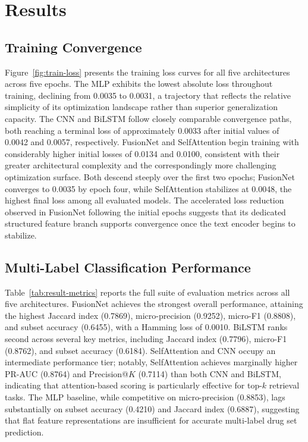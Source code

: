\section{Results}

\subsection{Training Convergence}


Figure~\ref{fig:train-loss} presents the training loss curves for all five architectures across five epochs. The MLP exhibits the lowest absolute loss throughout training, declining from 0.0035 to 0.0031, a trajectory that reflects the relative simplicity of its optimization landscape rather than superior generalization capacity. The CNN and BiLSTM follow closely comparable convergence paths, both reaching a terminal loss of approximately 0.0033 after initial values of 0.0042 and 0.0057, respectively. FusionNet and SelfAttention begin training with considerably higher initial losses of 0.0134 and 0.0100, consistent with their greater architectural complexity and the correspondingly more challenging optimization surface. Both descend steeply over the first two epochs; FusionNet converges to 0.0035 by epoch four, while SelfAttention stabilizes at 0.0048, the highest final loss among all evaluated models. The accelerated loss reduction observed in FusionNet following the initial epochs suggests that its dedicated structured feature branch supports convergence once the text encoder begins to stabilize.

\subsection{Multi-Label Classification Performance}


Table~\ref{tab:result-metrics} reports the full suite of evaluation metrics across all five architectures. FusionNet achieves the strongest overall performance, attaining the highest Jaccard index (0.7869), micro-precision (0.9252), micro-F1 (0.8808), and subset accuracy (0.6455), with a Hamming loss of 0.0010. BiLSTM ranks second across several key metrics, including Jaccard index (0.7796), micro-F1 (0.8762), and subset accuracy (0.6184). SelfAttention and CNN occupy an intermediate performance tier; notably, SelfAttention achieves marginally higher PR-AUC (0.8764) and Precision@$K$ (0.7114) than both CNN and BiLSTM, indicating that attention-based scoring is particularly effective for top-$k$ retrieval tasks. The MLP baseline, while competitive on micro-precision (0.8853), lags substantially on subset accuracy (0.4210) and Jaccard index (0.6887), suggesting that flat feature representations are insufficient for accurate multi-label drug set prediction.

